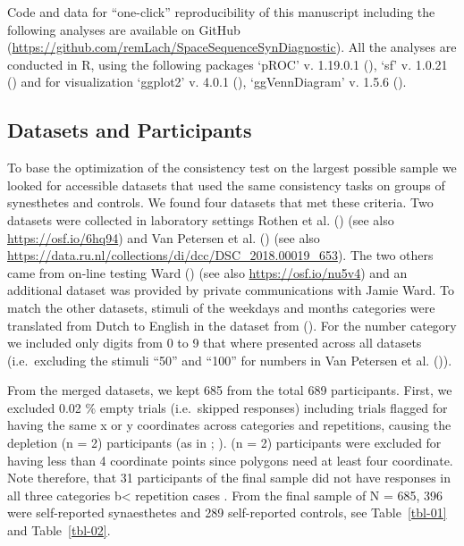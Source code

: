 \documentclass[
  man,
  floatsintext,
  longtable,
  a4paper,
  nolmodern,
  notxfonts,
  notimes,
  colorlinks=true,linkcolor=blue,citecolor=blue,urlcolor=blue]{apa7}
\begin{document}
Code and data for ``one-click'' reproducibility of this manuscript
including the following analyses are available on GitHub
(\url{https://github.com/remLach/SpaceSequenceSynDiagnostic}). All the
analyses are conducted in R, using the following packages `pROC' v.
1.19.0.1 (), `sf' v. 1.0.21
() and for visualization
`ggplot2' v. 4.0.1 (),
`ggVennDiagram' v. 1.5.6 ().

\subsection{Datasets and Participants}\label{datasets-and-participants}

To base the optimization of the consistency test on the largest possible
sample we looked for accessible datasets that used the same consistency
tasks on groups of synesthetes and controls. We found four datasets that
met these criteria. Two datasets were collected in laboratory settings
Rothen et al. () (see also
\href{https://osf.io/6hq94/files/osfstorage}{https://osf.io/6hq94}) and
Van Petersen et al. () (see also
\url{https://data.ru.nl/collections/di/dcc/DSC_2018.00019_653}). The two
others came from on-line testing Ward ()
(see also \url{https://osf.io/nu5v4}) and an additional dataset was
provided by private communications with Jamie Ward. To match the other
datasets, stimuli of the weekdays and months categories were translated
from Dutch to English in the dataset from
(). For the
number category we included only digits from 0 to 9 that where presented
across all datasets (i.e.~excluding the stimuli ``50'' and ``100'' for
numbers in Van Petersen et al. ()).

From the merged datasets, we kept 685 from the total 689 participants.
First, we excluded 0.02 \% empty trials (i.e.~skipped responses)
including trials flagged for having the same x or y coordinates across
categories and repetitions, causing the depletion (n = 2) participants
(as in ;
). (n = 2) participants were
excluded for having less than 4 coordinate points since polygons need at
least four coordinate. Note therefore, that 31 participants of the final
sample did not have responses in all three categories b\textless{}
repetition cases
.
From the final sample of N = 685, 396 were self-reported synaesthetes
and 289 self-reported controls, see Table~\ref{tbl-01} and
Table~\ref{tbl-02}.
\end{document}
